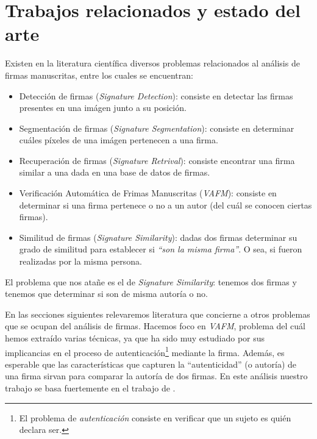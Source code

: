 
\chapter{Trabajos relacionados y estado del arte} \label{chapter:trabajos-anteriores}

Existen en la literatura científica diversos problemas relacionados al análisis de firmas manuscritas, entre los cuales se encuentran:

\begin{itemize}
    \item Detección de firmas (\textit{Signature Detection}): consiste en detectar las firmas presentes en una imágen junto a su posición. \cite{signature-detection}
    \item Segmentación de firmas (\textit{Signature Segmentation}): consiste en determinar cuáles píxeles de una imágen pertenecen a una firma. \cite{dnp98}
    \item Recuperación de firmas (\textit{Signature Retrival}): consiste encontrar una firma similar a una dada en una base de datos de firmas. \cite{signature-retrival} \cite{signature-hash}
    \item Verificación Automática de Frimas Manuscritas (\textit{VAFM}): consiste en determinar si una firma pertenece o no a un autor (del cuál se conocen ciertas firmas). \cite{nr77} \cite{ip08} \cite{ipp12} \cite{tesis-parodi}
    \item Similitud de firmas (\textit{Signature Similarity}): dadas dos firmas determinar su grado de similitud para establecer si \textit{``son la misma firma''}. O sea, si fueron realizadas por la misma persona.
\end{itemize} 

El problema que nos atañe es el de \textit{Signature Similarity}: tenemos dos firmas y tenemos que determinar si son de misma autoría o no.

En las secciones siguientes relevaremos literatura que concierne a otros problemas que se ocupan del análisis de firmas. Hacemos foco en \textit{VAFM}, problema del cuál hemos extraído varias técnicas, ya que ha sido muy estudiado por sus implicancias en el proceso de autenticación\footnote{El problema de \textit{autenticación} consiste en verificar que un sujeto es quién declara ser.} mediante la firma. Además, es esperable que las características que capturen la ``autenticidad'' (o autoría) de una firma sirvan para comparar la autoría de dos firmas. En este análisis nuestro trabajo se basa fuertemente en el trabajo de \cite{tesis-parodi}.

